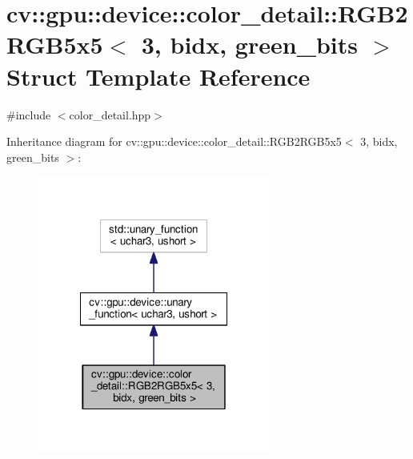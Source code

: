 \hypertarget{structcv_1_1gpu_1_1device_1_1color__detail_1_1RGB2RGB5x5_3_013_00_01bidx_00_01green__bits_01_4}{\section{cv\-:\-:gpu\-:\-:device\-:\-:color\-\_\-detail\-:\-:R\-G\-B2\-R\-G\-B5x5$<$ 3, bidx, green\-\_\-bits $>$ Struct Template Reference}
\label{structcv_1_1gpu_1_1device_1_1color__detail_1_1RGB2RGB5x5_3_013_00_01bidx_00_01green__bits_01_4}
}


{\ttfamily \#include $<$color\-\_\-detail.\-hpp$>$}



Inheritance diagram for cv\-:\-:gpu\-:\-:device\-:\-:color\-\_\-detail\-:\-:R\-G\-B2\-R\-G\-B5x5$<$ 3, bidx, green\-\_\-bits $>$\-:\nopagebreak
\begin{figure}[H]
\begin{center}
\leavevmode
\includegraphics[width=216pt]{structcv_1_1gpu_1_1device_1_1color__detail_1_1RGB2RGB5x5_3_013_00_01bidx_00_01green__bits_01_4__inherit__graph}
\end{center}
\end{figure}


